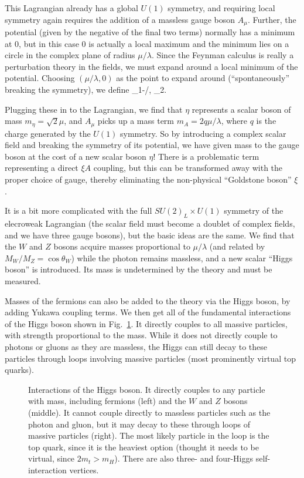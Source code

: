 This  Lagrangian already has a global $U(1)$ symmetry, and requiring local symmetry again requires the addition
of a massless gauge boson $A_\mu$.
Further, the potential (given by the negative of the final two terms) normally has a minimum at 0, but in this case 0 is
actually a local maximum and the minimum lies on a circle in the complex plane of radius $\mu/\lambda$.
Since the Feynman calculus is really a perturbation theory in the fields, we must expand around a local minimum of the
potential. Choosing $(\mu/\lambda,0)$ as the point to expand around (``spontaneously'' breaking the symmetry), we define
\be
\eta\equiv\phi_1-\mu/\lambda, \;\;\; \xi\equiv\phi_2.
\ee

Plugging these in to the Lagrangian, we find that $\eta$ represents a scalar boson of mass $m_\eta=\sqrt{2}\mu$,
and $A_\mu$ picks up a mass term $m_A=2q\mu/\lambda$, where $q$ is the charge generated by the $U(1)$
symmetry. So by introducing a complex scalar field and breaking the symmetry of its potential, we have given
mass to the gauge boson at the cost of a new scalar boson $\eta$! There is a problematic term representing
a direct $\xi A$ coupling, but this can be transformed away with the proper choice of gauge, thereby eliminating 
the non-physical ``Goldstone boson'' $\xi$.

It is a bit more complicated with the full $SU(2)_L\times U(1)$ symmetry of the elecroweak Lagrangian (the scalar
field must become a doublet of complex fields, and we have three gauge bosons), but the basic ideas are the same.
We find that the $W$ and $Z$ bosons acquire masses proportional to $\mu/\lambda$ (and related by $M_W/M_Z=\cos\theta_W$)
while the photon remains massless, and a new scalar ``Higgs boson'' is introduced. Its mass is undetermined by the theory
and must be measured.

Masses of the fermions can also be added to the theory via the Higgs boson, by adding Yukawa coupling terms. We then get all of the fundamental
interactions of the Higgs boson shown in Fig.~\ref{fig:higgs_diagrams}. It directly couples to all massive particles,
with strength proportional to the mass. While it does not directly couple to photons or gluons as they are massless,
the Higgs can still decay to these particles through loops involving massive particles (most prominently
virtual top quarks).

\begin{figure}[t]
  \addtolength{\abovecaptionskip}{5mm}
  \centering
  \vskip5mm
  
  
  
    \caption{Interactions of the Higgs boson. It directly couples to any particle with mass,
      including fermions (left) and the $W$ and $Z$ bosons (middle). It cannot couple directly
      to massless particles such as the photon and gluon, but it may decay to these through loops
      of massive particles (right). The most likely particle in the loop is the top quark, since
      it is the heaviest option (thought it needs to be virtual, since $2m_t > m_H$). There
      are also three- and four-Higgs self-interaction vertices.
            }
    \label{fig:higgs_diagrams}
\end{figure}

